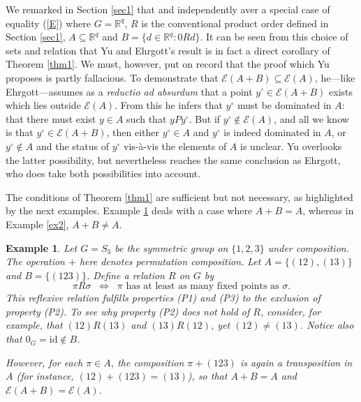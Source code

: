 \documentclass[pdflatex,sn-apa,11pt]{sn-jnl}%
\newtheorem{example}{Example}%
\begin{document}
We remarked in Section \ref{sec1} that \cite{yu1985multiple} and \cite{ehrgott2005multicriteria} independently aver a special case of equality (\ref{E}) where $G = \mathbb{R}^{q}$, $R$ is the conventional product order defined in Section \ref{sec1}, $A \subseteq \mathbb{R}^{q}$ and $B = \{d \in \mathbb{R}^{q}: 0Rd\}$. It can be seen from this choice of sets and relation that Yu and Ehrgott's result is in fact a direct corollary of Theorem \ref{thm1}. We must, however, put on record that the proof which Yu proposes is partly fallacious. To demonstrate that $\mathscr{E}(A+B) \subseteq \mathscr{E}(A)$, he---like Ehrgott---assumes as a \textit{reductio ad absurdum} that a point $y^{\circ} \in \mathscr{E}(A + B)$ exists which lies outside $\mathscr{E}(A)$. From this he infers that $y^{\circ}$ must be dominated in $A$: that there must exist $y \in A$ such that $yPy^{\circ}$. But if $y^{\circ} \notin \mathscr{E}(A)$, and all we know is that $y^{\circ} \in \mathscr{E}(A + B)$, then either $y^{\circ} \in A$ and $y^{\circ}$ is indeed dominated in $A$, or $y^{\circ} \notin A$ and the status of $y^{\circ}$ vis-à-vis the elements of $A$ is unclear. Yu overlooks the latter possibility, but nevertheless reaches the same conclusion as Ehrgott, who does take both possibilities into account.

The conditions of Theorem \ref{thm1} are sufficient but not necessary, as highlighted by the next examples. Example \ref{ex1} deals with a case where $A+B=A$, whereas in Example \ref{ex2}, $A+B \neq A$.

\begin{example}
\label{ex1}
Let $G = S_3$ be the symmetric group on $\{1,2,3\}$ under composition. The operation $+$ here denotes permutation composition. Let $A = \{(12),(13)\}$ and $B = \{(123)\}$. Define a relation $R$ on $G$ by
\[
\pi R \sigma \;\; \Longleftrightarrow \;\; 
\pi \text{ has at least as many fixed points as } \sigma.
\]
This reflexive relation fulfills properties (P1) and (P3) to the exclusion of property (P2). To see why property (P2) does not hold of $R$, consider, for example, that $(12)R(13)$ and $(13)R(12)$, yet $(12) \neq (13)$. Notice also that $0_G = \mathrm{id} \notin B$.

However, for each $\pi \in A$, the composition $\pi + (123)$ is again a transposition in $A$
(for instance, $(12)+(123) = (13)$), so that $A+B=A$
and $\mathscr{E}(A+B) = \mathscr{E}(A)$.
\end{example}
\end{document}
